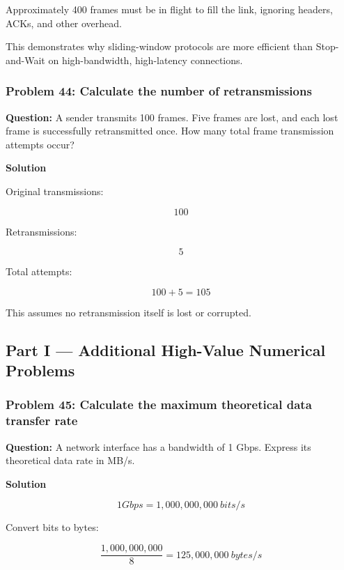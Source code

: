 Approximately 400 frames must be in flight to fill the link, ignoring headers, ACKs, and other overhead.

This demonstrates why sliding-window protocols are more efficient than Stop-and-Wait on high-bandwidth, high-latency connections.

\subsubsection*{Problem 44: Calculate the number of retransmissions}

\textbf{Question:} A sender transmits 100 frames. Five frames are lost, and each lost frame is successfully retransmitted once. How many total frame transmission attempts occur?

\textbf{Solution}

Original transmissions:



\[
100
\]



Retransmissions:



\[
5
\]



Total attempts:



\[
100+5=\boxed{105}
\]



This assumes no retransmission itself is lost or corrupted.

\subsection{Part I --- Additional High-Value Numerical Problems}
\subsubsection*{Problem 45: Calculate the maximum theoretical data transfer rate}

\textbf{Question:} A network interface has a bandwidth of 1 Gbps. Express its theoretical data rate in MB/s.

\textbf{Solution}



\[
1Gbps=1,000,000,000\ bits/s
\]



Convert bits to bytes:



\[
\frac{1,000,000,000}{8} =125,000,000\ bytes/s
\]





